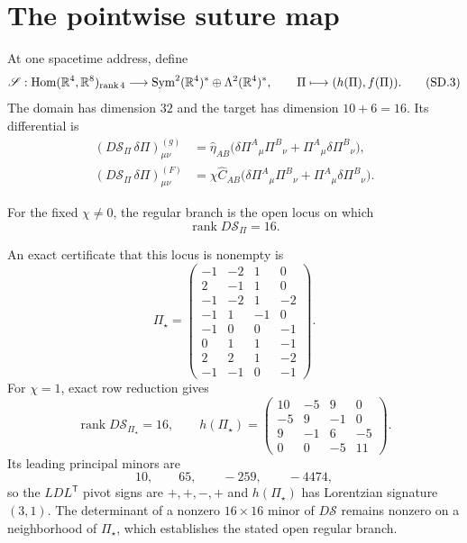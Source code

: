 \documentclass[10pt]{article}
\newcommand{\hateta}{\widehat\eta}
\newcommand{\hatC}{\widehat C}
\newcommand{\rankop}{\operatorname{rank}}
\begin{document}
\section{The pointwise suture map}

At one spacetime address, define
\[
\mathscr S:\operatorname{Hom}(\mathbb R^4,\mathbb R^8)_{\mathrm{rank}\,4}
\longrightarrow \operatorname{Sym}^2(\mathbb R^4)^*\oplus\Lambda^2(\mathbb R^4)^*,
\qquad
\Pi\longmapsto(h(\Pi),f(\Pi)).
\tag{SD.3}
\]
The domain has dimension $32$ and the target has dimension $10+6=16$. Its
differential is
\[
\begin{aligned}
(D\mathscr S_\Pi\,\delta\Pi)^{(g)}_{\mu\nu}
&=\hateta_{AB}\bigl(\delta\Pi^A{}_{\mu}\Pi^B{}_{\nu}
+\Pi^A{}_{\mu}\delta\Pi^B{}_{\nu}\bigr),\\
(D\mathscr S_\Pi\,\delta\Pi)^{(F)}_{\mu\nu}
&=\chi\hatC_{AB}\bigl(\delta\Pi^A{}_{\mu}\Pi^B{}_{\nu}
+\Pi^A{}_{\mu}\delta\Pi^B{}_{\nu}\bigr).
\end{aligned}
\tag{SD.4}
\]

\begin{definition}
For the fixed $\chi\ne0$, the regular branch is the open locus on which
\[
\rankop D\mathscr S_\Pi=16.
\tag{SD.5}
\]
\end{definition}

An exact certificate that this locus is nonempty is
\[
\Pi_\star=
\begin{pmatrix}
-1&-2& 1& 0\\
 2&-1& 1& 0\\
-1&-2& 1&-2\\
-1& 1&-1& 0\\
-1& 0& 0&-1\\
 0& 1& 1&-1\\
 2& 2& 1&-2\\
-1&-1& 0&-1
\end{pmatrix}.
\tag{SD.6}
\]
For $\chi=1$, exact row reduction gives
\[
\rankop D\mathscr S_{\Pi_\star}=16,
\qquad
h(\Pi_\star)=
\begin{pmatrix}
10&-5& 9& 0\\
-5& 9&-1& 0\\
 9&-1& 6&-5\\
 0& 0&-5&11
\end{pmatrix}.
\tag{SD.7}
\]
Its leading principal minors are
\[
10,\qquad65,\qquad-259,\qquad-4474,
\tag{SD.8}
\]
so the $LDL^{\mathsf T}$ pivot signs are $+,+,-,+$ and
$h(\Pi_\star)$ has Lorentzian signature $(3,1)$. The determinant of a
nonzero $16\times16$ minor of $D\mathscr S$ remains nonzero on a
neighborhood of $\Pi_\star$, which establishes the stated open regular
branch.
\end{document}

